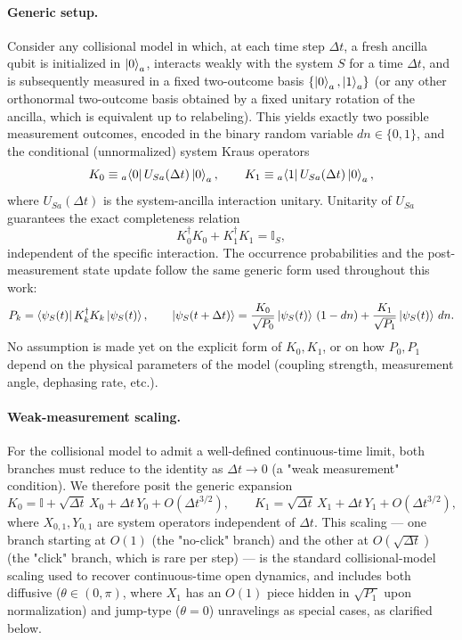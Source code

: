 \documentclass[a4paper,12pt]{article}
\begin{document}
\paragraph{Generic setup.}
Consider any collisional model in which, at each time step $\Delta t$, a fresh ancilla qubit is initialized in $\ket{0}_a$, interacts weakly with the system $S$ for a time $\Delta t$, and is subsequently measured in a fixed two-outcome basis $\{\ket{0}_a,\ket{1}_a\}$ (or any other orthonormal two-outcome basis obtained by a fixed unitary rotation of the ancilla, which is equivalent up to relabeling). This yields exactly two possible measurement outcomes, encoded in the binary random variable $dn\in\{0,1\}$, and the conditional (unnormalized) system Kraus operators
\begin{equation}
	K_{0} \equiv {}_{a}\!\bra{0} U_{Sa}(\Delta t) \ket{0}_{a}, \qquad K_{1} \equiv {}_{a}\!\bra{1} U_{Sa}(\Delta t) \ket{0}_{a},
	\label{eq:generic_Kraus_def}
\end{equation}
where $U_{Sa}(\Delta t)$ is the system-ancilla interaction unitary. Unitarity of $U_{Sa}$ guarantees the exact completeness relation
\begin{equation}
	K_{0}^{\dagger}K_{0} + K_{1}^{\dagger}K_{1} = \mathbb{I}_{S},
	\label{eq:generic_completeness}
\end{equation}
independent of the specific interaction. The occurrence probabilities and the post-measurement state update follow the same generic form used throughout this work:
\begin{equation}
	P_{k} = \bra{\psi_{S}(t)} K_{k}^{\dagger}K_{k} \ket{\psi_{S}(t)}, \qquad
	\ket{\psi_{S}(t+\Delta t)} = \frac{K_{0}}{\sqrt{P_{0}}}\ket{\psi_{S}(t)}\,(1-dn) + \frac{K_{1}}{\sqrt{P_{1}}}\ket{\psi_{S}(t)}\,dn.
	\label{eq:generic_update}
\end{equation}
No assumption is made yet on the explicit form of $K_{0}, K_{1}$, or on how $P_{0},P_{1}$ depend on the physical parameters of the model (coupling strength, measurement angle, dephasing rate, etc.).

\paragraph{Weak-measurement scaling.}
For the collisional model to admit a well-defined continuous-time limit, both branches must reduce to the identity as $\Delta t\to0$ (a "weak measurement" condition). We therefore posit the generic expansion
\begin{equation}
	K_{0} = \mathbb{I} + \sqrt{\Delta t}\, X_{0} + \Delta t\, Y_{0} + O(\Delta t^{3/2}), \qquad
	K_{1} = \sqrt{\Delta t}\, X_{1} + \Delta t\, Y_{1} + O(\Delta t^{3/2}),
	\label{eq:generic_weak_expansion}
\end{equation}
where $X_{0,1}, Y_{0,1}$ are system operators independent of $\Delta t$. This scaling — one branch starting at $O(1)$ (the "no-click" branch) and the other at $O(\sqrt{\Delta t})$ (the "click" branch, which is rare per step) — is the standard collisional-model scaling used to recover continuous-time open dynamics, and includes both diffusive ($\theta \in (0,\pi)$, where $X_1$ has an $O(1)$ piece hidden in $\sqrt{P_1}$ upon normalization) and jump-type ($\theta=0$) unravelings as special cases, as clarified below.
\end{document}
